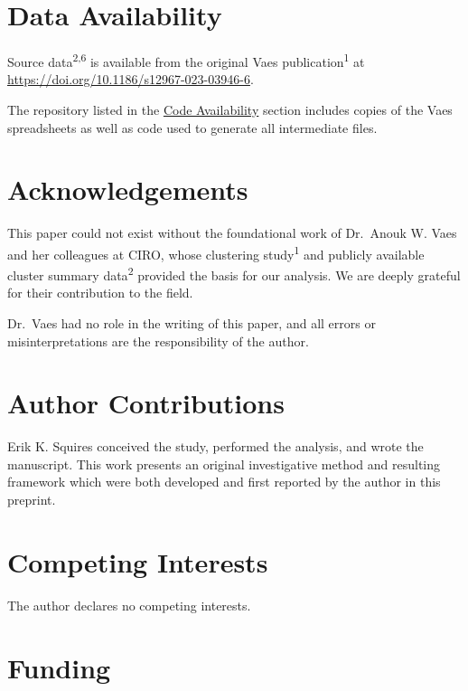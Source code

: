 \documentclass[
  letterpaper,
  DIV=11,
  numbers=noendperiod]{scrartcl}
\begin{document}
\section*{Data Availability}\label{sec-data}

Source data\textsuperscript{2,6} is available from the original Vaes
publication\textsuperscript{1} at
\url{https://doi.org/10.1186/s12967-023-03946-6}.

The repository listed in the \hyperref[sec-code]{Code Availability}
section includes copies of the Vaes spreadsheets as well as code used to
generate all intermediate files.

\newpage{}

\section*{Acknowledgements}\label{acknowledgements}

This paper could not exist without the foundational work of Dr.~Anouk W.
Vaes and her colleagues at CIRO, whose clustering
study\textsuperscript{1} and publicly available cluster summary
data\textsuperscript{2} provided the basis for our analysis. We are
deeply grateful for their contribution to the field.

Dr.~Vaes had no role in the writing of this paper, and all errors or
misinterpretations are the responsibility of the author.

\section*{Author Contributions}\label{author-contributions}

Erik K. Squires conceived the study, performed the analysis, and wrote
the manuscript. This work presents an original investigative method and
resulting framework which were both developed and first reported by the
author in this preprint.

\section*{Competing Interests}\label{competing-interests}

The author declares no competing interests.

\section*{Funding}\label{funding}
\end{document}
